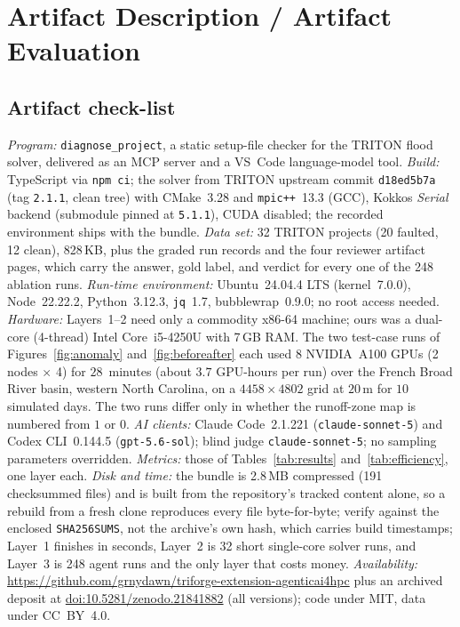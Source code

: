 \documentclass[conference]{IEEEtran}
\begin{document}




\clearpage
\appendices
\section{Artifact Description / Artifact Evaluation}
\label{sec:reproducibility}

\subsection*{Artifact check-list}
\emph{Program:} \texttt{diagnose\_project}, a static setup-file checker for the TRITON flood
solver, delivered as an MCP server and a VS~Code language-model tool.
\emph{Build:} TypeScript via \texttt{npm ci}; the solver from TRITON upstream commit
\texttt{d18ed5b7a} (tag \texttt{2.1.1}, clean tree) with CMake~3.28 and
\texttt{mpic++}~13.3 (GCC), Kokkos \emph{Serial} backend (submodule pinned at
\texttt{5.1.1}), CUDA disabled; the recorded environment ships with the bundle.
\emph{Data set:} 32 TRITON projects (20 faulted, 12 clean), 828\,KB, plus the graded run
records and the four reviewer artifact pages, which carry the answer, gold label, and
verdict for every one of the 248 ablation runs.
\emph{Run-time environment:} Ubuntu~24.04.4 LTS (kernel~7.0.0), Node~22.22.2,
Python~3.12.3, \texttt{jq}~1.7, bubblewrap~0.9.0; no root access needed.
\emph{Hardware:} Layers~1--2 need only a commodity x86-64 machine; ours was a dual-core
(4-thread) Intel Core~i5-4250U with 7\,GB RAM. The two test-case runs of
Figures~\ref{fig:anomaly} and~\ref{fig:beforeafter} each used 8 NVIDIA~A100 GPUs
(2 nodes $\times$ 4) for $28$~minutes (about $3.7$ GPU-hours per run) over the French Broad
River basin, western North Carolina, on a $4458\times4802$ grid at $20$\,m for $10$ simulated
days. The two runs differ only in whether the runoff-zone map is numbered from $1$ or $0$.
\emph{AI clients:} Claude Code~2.1.221 (\texttt{claude-sonnet-5}) and Codex CLI~0.144.5
(\texttt{gpt-5.6-sol}); blind judge \texttt{claude-sonnet-5}; no sampling parameters overridden.
\emph{Metrics:} those of Tables~\ref{tab:results} and~\ref{tab:efficiency}, one layer each.
\emph{Disk and time:} the bundle is 2.8\,MB compressed (191 checksummed files) and is built from
the repository's tracked content alone, so a rebuild from a fresh clone reproduces every file
byte-for-byte; verify against the enclosed \texttt{SHA256SUMS}, not the archive's own hash, which
carries build timestamps;
Layer~1 finishes in seconds, Layer~2 is 32 short single-core solver runs, and Layer~3 is
248 agent runs and the only layer that costs money.
\emph{Availability:} \url{https://github.com/grnydawn/triforge-extension-agenticai4hpc} plus an
archived deposit at \href{https://doi.org/10.5281/zenodo.21841882}{doi:10.5281/zenodo.21841882}
(all versions); code under MIT, data under CC~BY~4.0.
\end{document}
